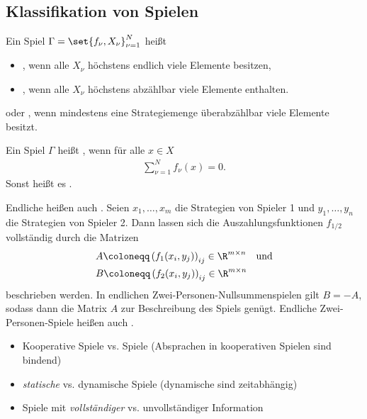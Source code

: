 \subsection{Klassifikation von Spielen}
\begin{definition*}
  Ein Spiel $\Gamma=\set{f_{\nu}, X_{\nu}}_{\nu = 1}^{N}$ heißt
  \begin{itemize}
  \item {}, wenn alle $X_{\nu}$ höchstens endlich viele Elemente besitzen, 
  \item {}, wenn alle $X_{\nu}$ höchstens abzählbar viele Elemente enthalten. 
  \end{itemize}
\item {} oder , wenn mindestens eine Strategiemenge überabzählbar viele Elemente besitzt. 
\end{definition*}
\begin{definition*}
  Ein Spiel $\Gamma$ heißt , wenn für alle $x \in X$
  \begin{align*}
    \sum_{\nu = 1}^{N} f_{\nu}(x) = 0.
  \end{align*}
Sonst heißt es . 
\end{definition*}
 Endliche  heißen auch . Seien $x_{1}, \dots, x_{m}$ die Strategien von Spieler 1 und $y_{1}, \dots, y_{n}$ die Strategien von Spieler 2. Dann lassen sich die Auszahlungsfunktionen $f_{1/2}$ vollständig durch die Matrizen
 \begin{align*}
&   A \coloneqq \left(f_{1}(x_{i},y_{j}) \right)_{ij} \in \R^{m \times n} \quad \text{und}\\
&   B \coloneqq \left(f_{2}(x_{i},y_{j}) \right)_{ij} \in \R^{m \times n}
 \end{align*}
beschrieben werden. In endlichen Zwei-Personen-Nullsummenspielen gilt $B = -A$, sodass dann die Matrix $A$ zur Beschreibung des Spiels genügt. Endliche Zwei-Personen-Spiele heißen auch .
\begin{itemize}
\item Kooperative Spiele vs.  Spiele (Absprachen in kooperativen Spielen sind bindend)
\item \emph{statische} vs. dynamische Spiele (dynamische sind zeitabhängig)
\item Spiele mit \emph{vollständiger} vs. unvollständiger Information
\end{itemize}

